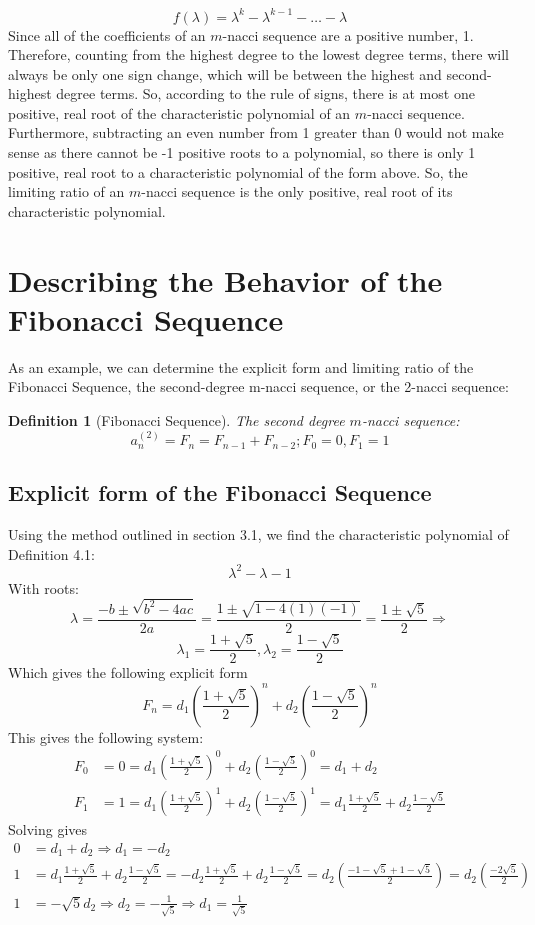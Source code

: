 \documentclass[11pt]{article}
\newtheorem{definition}[theorem]{Definition}
\begin{document}
\[f(\lambda)=\lambda^{k}-\lambda^{k-1}-\dots-\lambda\]
Since all of the coefficients of an \(m\)-nacci sequence are a positive number, 1. Therefore, counting from the highest degree to the lowest degree terms, there will always be only one sign change, which will be between the highest and second-highest degree terms. So, according to the rule of signs, there is at most one positive, real root of the characteristic polynomial of an \(m\)-nacci sequence. 
Furthermore, subtracting an even number from 1 greater than 0 would not make sense as there cannot be -1 positive roots to a polynomial, so there is only 1 positive, real root to a characteristic polynomial of the form above. So, the limiting ratio of an \(m\)-nacci sequence is the only positive, real root of its characteristic polynomial.



\section{Describing the Behavior of the Fibonacci Sequence}

As an example, we can determine the explicit form and limiting ratio of the Fibonacci Sequence, the second-degree m-nacci sequence, or the 2-nacci sequence:

\begin{definition}[Fibonacci Sequence]The second degree \(m\)-nacci sequence:
    \[a_{n}^{(2)}=F_n=F_{n-1}+F_{n-2}; F_0=0, F_1=1\]
\end{definition}

\subsection{Explicit form of the Fibonacci Sequence}
Using the method outlined in section 3.1, we find the characteristic polynomial of Definition 4.1:
$$\lambda^2-\lambda-1$$
With roots:
\[\lambda=\frac{-b\pm\sqrt{b^2-4ac}}{2a}=\frac{1\pm\sqrt{1-4(1)(-1)}}{2}=\frac{1\pm\sqrt{5}}{2}\Rightarrow\]
$$\lambda_1=\frac{1+\sqrt{5}}{2},\lambda_2=\frac{1-\sqrt{5}}{2}$$
Which gives the following explicit form
$$F_n=d_1\left(\frac{1+\sqrt{5}}{2}\right)^n+d_2\left(\frac{1-\sqrt{5}}{2}\right)^n$$
This gives the following system:
\begin{align*}
    F_0&=0=d_1\left(\frac{1+\sqrt{5}}{2}\right)^0+d_2\left(\frac{1-\sqrt{5}}{2}\right)^0 = d_1+d_2 \\
    F_1&=1=d_1\left(\frac{1+\sqrt{5}}{2}\right)^1+d_2\left(\frac{1-\sqrt{5}}{2}\right)^1 = d_1\frac{1+\sqrt{5}}{2}+d_2\frac{1-\sqrt{5}}{2}
\end{align*}
Solving gives 
\begin{align*}
    0 &= d_1+d_2 \Rightarrow d_1=-d_2\\
    1 &= d_1\frac{1+\sqrt{5}}{2}+d_2\frac{1-\sqrt{5}}{2} = -d_2\frac{1+\sqrt{5}}{2}+d_2\frac{1-\sqrt{5}}{2}= d_2\left(\frac{-1-\sqrt{5}+1-\sqrt{5}}{2}\right)= d_2\left(\frac{-2\sqrt{5}}{2}\right) \\
    1 &= -\sqrt{5}d_2\Rightarrow d_2=-\frac{1}{\sqrt{5}} \Rightarrow d_1=\frac{1}{\sqrt{5}}
\end{align*}
\end{document}
